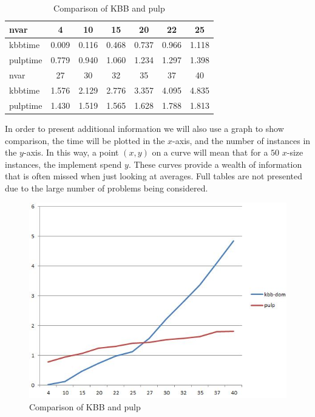 \documentclass[a4paper,11pt]{article}
\begin{document}
\begin{table}[H]
\begin{center}
\begin{tabular}{l c c c c c c}
\hline
nvar&4&10&15&20&22&25\\
\hline
kbbtime&0.009&0.116&0.468&0.737&0.966&1.118\\
pulptime&0.779&0.940&1.060&1.234&1.297&1.398\\
\hline\hline
nvar&27&30&32&35&37&40\\
\hline
kbbtime&1.576&2.129&2.776&3.357&4.095&4.835\\
pulptime&1.430&1.519&1.565&1.628&1.788&1.813\\
\hline
\end{tabular}
\end{center}
\caption{Comparison of KBB and pulp\label{numtab}}
\end{table}

In order to present additional information we will also use a graph to show comparison, the time will be plotted in the $x$-axis, and the number of instances in the $y$-axis. In this way, a point $(x,y)$ on a curve will mean that for a $50$ $x$-size instances, the implement spend $y$. These curves provide a wealth of information that is often missed when just looking at averages. Full tables are not presented due to the large number of problems being considered.

\begin{figure}[H]
\begin{center}
\includegraphics[scale=0.6]{1}
\end{center}
\caption{Comparison of KBB and pulp \label{numfig}}
\end{figure}
\end{document}
